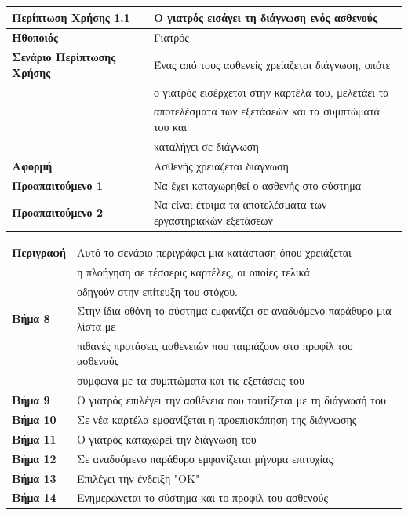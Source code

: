 \documentclass{article}
\newcommand\T{\rule{0pt}{2.6ex}}       %
\newcommand\B{\rule[-1.2ex]{0pt}{0pt}}
\begin{document}
 \begin{center}
     \begin{tabular}{|l|l|}
     \hline
      \textbf{Περίπτωση Χρήσης 1.1} & Ο γιατρός εισάγει τη διάγνωση ενός ασθενούς \T\B \\ 
      \hline
      \textbf{Ηθοποιός} & Γιατρός \T\B \\
      \hline
      \textbf{Σενάριο Περίπτωσης Χρήσης} & Ένας από τους ασθενείς χρείαζεται διάγνωση, οπότε \T\\& ο γιατρός εισέρχεται στην καρτέλα του, μελετάει τα\\& αποτελέσματα των εξετάσεών και τα συμπτώματά του και \\& καταλήγει σε διάγνωση \B \\
      \hline
      \textbf{Αφορμή} & Ασθενής χρειάζεται διάγνωση \T\B \\
      \hline
      \textbf{Προαπαιτούμενο 1} & Να έχει καταχωρηθεί ο ασθενής στο σύστημα \T\B \\
      \hline
      \textbf{Προαπαιτούμενο 2} & Να είναι έτοιμα τα αποτελέσματα των εργαστηριακών εξετάσεων \T\B \\
      \hline
     \end{tabular}
 \end{center}
 
  \vspace{0.2cm}
 
 \begin{center}
     \begin{tabular}{|l|l|}
     \hline
      \textbf{Περιγραφή} & Αυτό το σενάριο περιγράφει μια κατάσταση όπου χρειάζεται \T \\& η πλοήγηση σε τέσσερις καρτέλες, οι οποίες τελικά\\& οδηγούν στην επίτευξη του στόχου. \B \\ 
      \hline
      \textbf{Βήμα 8} & Στην ίδια οθόνη το σύστημα εμφανίζει σε αναδυόμενο παράθυρο μια λίστα με \T \\& πιθανές προτάσεις ασθενειών που ταιριάζουν στο προφίλ του ασθενούς \\& σύμφωνα με τα συμπτώματα και τις εξετάσεις του \B \\
      \hline
      \textbf{Βήμα 9} & Ο γιατρός επιλέγει την ασθένεια που ταυτίζεται με τη διάγνωσή του  \T\B \\
      \hline
      \textbf{Βήμα 10} & Σε νέα καρτέλα εμφανίζεται η προεπισκόπηση της διάγνωσης \T\B \\
      \hline
      \textbf{Βήμα 11} & Ο γιατρός καταχωρεί την διάγνωση του \T\B \\
      \hline
      \textbf{Βήμα 12} & Σε αναδυόμενο παράθυρο εμφανίζεται μήνυμα επιτυχίας \T\B \\
      \hline    
      \textbf{Βήμα 13} & Επιλέγει την ένδειξη "ΟΚ" \T\B \\ 
      \hline
      \textbf{Βήμα 14} & Ενημερώνεται το σύστημα και το προφίλ του ασθενούς \T\B \\
      \hline
    \end{tabular}
 \end{center}
 
\end{document}
